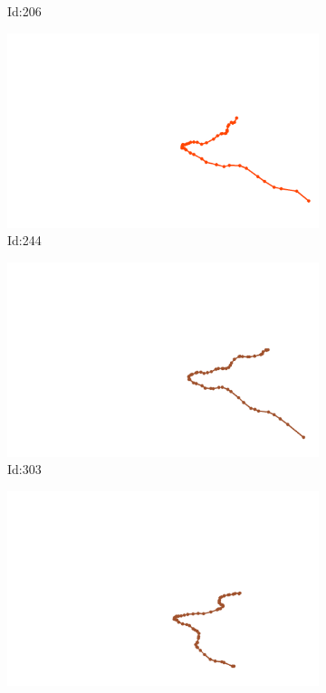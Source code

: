 \documentclass[12pt,twoside]{report}
\begin{document}
\begin{figure}
\begin{subfigure}[b]{0.20\textwidth}
\caption{Id:206}
\end{subfigure}
\begin{subfigure}[b]{0.20\textwidth}
\centering
\includegraphics[width=\textwidth]{../trajectories/244.png}
\caption{Id:244}
\end{subfigure}
\begin{subfigure}[b]{0.20\textwidth}
\centering
\includegraphics[width=\textwidth]{../trajectories/303.png}
\caption{Id:303}
\end{subfigure}
\begin{subfigure}[b]{0.20\textwidth}
\centering
\includegraphics[width=\textwidth]{../trajectories/317.png}

\end{subfigure}
\end{figure}
\end{document}
